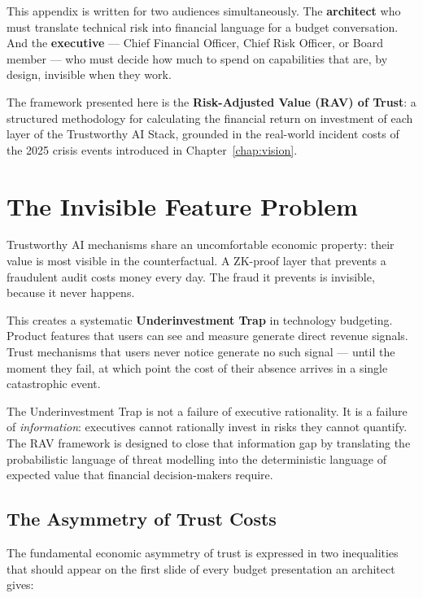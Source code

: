 This appendix is written for two audiences simultaneously.
The \textbf{architect} who must translate technical risk into
financial language for a budget conversation.
And the \textbf{executive} --- Chief Financial Officer,
Chief Risk Officer, or Board member --- who must decide how
much to spend on capabilities that are, by design, invisible
when they work.

The framework presented here is the
\textbf{Risk-Adjusted Value (RAV) of Trust}: a structured
methodology for calculating the financial return on investment
of each layer of the Trustworthy AI Stack, grounded in the
real-world incident costs of the 2025 crisis events introduced
in Chapter~\ref{chap:vision}.

\section{The Invisible Feature Problem}
\label{sec:invisible-feature}

Trustworthy AI mechanisms share an uncomfortable economic
property: their value is most visible in the counterfactual.
A ZK-proof layer that prevents a fraudulent audit costs money
every day.
The fraud it prevents is invisible, because it never happens.

This creates a systematic \textbf{Underinvestment Trap} in
technology budgeting.
Product features that users can see and measure generate direct
revenue signals.
Trust mechanisms that users never notice generate no such signal
--- until the moment they fail, at which point the cost of
their absence arrives in a single catastrophic event.

The Underinvestment Trap is not a failure of executive
rationality.
It is a failure of \emph{information}: executives cannot
rationally invest in risks they cannot quantify.
The RAV framework is designed to close that information gap
by translating the probabilistic language of threat modelling
into the deterministic language of expected value that
financial decision-makers require.

\subsection{The Asymmetry of Trust Costs}
\label{subsec:cost-asymmetry}

The fundamental economic asymmetry of trust is expressed in
two inequalities that should appear on the first slide of
every budget presentation an architect gives:

